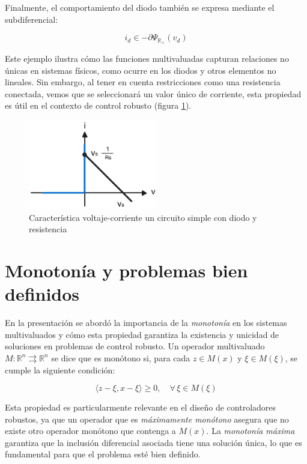 \documentclass[conference]{IEEEtran}
\begin{document}
Finalmente, el comportamiento del diodo también se expresa mediante el subdiferencial:

\begin{equation}
	i_d \in -\partial \Psi_{\mathbb{R}_+}(v_d)
\end{equation}

Este ejemplo ilustra cómo las funciones multivaluadas capturan relaciones no únicas en sistemas físicos, como ocurre en los diodos y otros elementos no lineales. Sin embargo, al tener en cuenta restricciones como una resistencia conectada, vemos que se seleccionará un valor único de corriente, esta propiedad es útil en el contexto de control robusto (figura \ref{fig:caracteristica}).

\begin{figure}[h]
	\centering
	\includegraphics[width=0.5\textwidth]{v_vs_i.jpeg}
	\caption{Característica voltaje-corriente un circuito simple con diodo y resistencia}
	\label{fig:caracteristica}
\end{figure}


\section{Monotonía y problemas bien definidos}

En la presentación se abordó la importancia de la \textit{monotonía} en los sistemas multivaluados y cómo esta propiedad garantiza la existencia y unicidad de soluciones en problemas de control robusto. Un operador multivaluado \( M: \mathbb{R}^n \rightrightarrows \mathbb{R}^n \) se dice que es monótono si, para cada \( z \in M(x) \) y \( \xi \in M(\xi) \), se cumple la siguiente condición:

\begin{equation}
	\langle z - \xi, x - \xi \rangle \geq 0, \quad \forall \, \xi \in M(\xi)
\end{equation}

Esta propiedad es particularmente relevante en el diseño de controladores robustos, ya que un operador que es \textit{máximamente monótono} asegura que no existe otro operador monótono que contenga a \( M(x) \). La \textit{monotonía máxima} garantiza que la inclusión diferencial asociada tiene una solución única, lo que es fundamental para que el problema esté bien definido.
\end{document}
